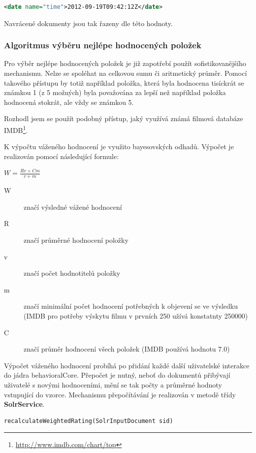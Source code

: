 \documentclass[thesis=M,czech]{FITthesis}[2014/05/07]
\begin{document}
\begin{lstlisting}[language=xml]
<date name="time">2012-09-19T09:42:12Z</date>
\end{lstlisting}

Navrácené dokumenty jsou tak řazeny dle této hodnoty.

\subsubsection{Algoritmus výběru nejlépe hodnocených položek}
Pro výběr nejlépe hodnocených položek je již zapotřebí použít sofistikovanějšího mechanismu. Nelze se spoléhat na celkovou sumu či aritmetický průměr. Pomocí takového přístupu by totiž například položka, která byla hodnocena tisíckrát se známkou 1 (z 5 možných) byla považována za lepší než například položka hodnocená stokrát, ale vždy se známkou 5.

Rozhodl jsem se použít podobný přístup, jaký využívá známá filmová databáze IMDB\footnote{\url{http://www.imdb.com/chart/top}}. 

K výpočtu váženého hodnocení je využito bayesovských odhadů. Výpočet je realizován pomocí následující formule:

\begin{center}
$W = \frac{Rv + Cm}{v + m}$
\end{center}

\begin{description}
	\item[W] značí výsledné vážené hodnocení
	\item[R] značí průměrné hodnocení položky
	\item[v] značí počet hodnotitelů položky
	\item[m] značí minimální počet hodnocení potřebných k objevení se ve výsledku (IMDB pro potřeby výskytu filmu v prvních 250 užívá konstatnty 250000)
	\item[C] značí průměr hodnocení všech položek (IMDB používá hodnotu 7.0)
\end{description}

Výpočet váženého hodnocení probíhá po přidání každé další uživatelské interakce do jádra behavioralCore. Přepočet je nutný, neboť do dokumentů přibývají uživatelé s novými hodnoceními, mění se tak počty a průměrné hodnoty vstupující do vzorce. Mechanismu přepočítávání je realizován v metodě třídy \textbf{SolrService}.

\begin{verbatim}
recalculateWeightedRating(SolrInputDocument sid)
\end{verbatim}
\end{document}
